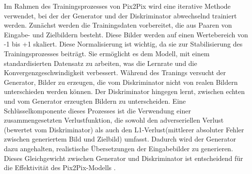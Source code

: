 Im Rahmen des Trainingsprozesses von Pix2Pix wird eine iterative Methode verwendet, bei der der Generator und der Diskriminator abwechselnd trainiert werden. Zunächst werden die Trainingsdaten vorbereitet, die aus Paaren von Eingabe- und Zielbildern besteht. Diese Bilder werden auf einen Wertebereich von -1 bis +1 skaliert. Diese Normalisierung ist wichtig, da sie zur Stabilisierung des Trainingsprozesses beiträgt. Sie ermöglicht es dem Modell, mit einem standardisierten Datensatz zu arbeiten, was die Lernrate und die Konvergenzgeschwindigkeit verbessert. Während des Tranings versucht der Generator, Bilder zu erzeugen, die vom Diskriminator nicht von realen Bildern unterschieden werden können. Der Diskriminator hingegen lernt, zwischen echten und vom Generator erzeugten Bildern zu unterscheiden. Eine Schlüsselkomponente dieses Prozesses ist die Verwendung einer zusammengesetzten Verlustfunktion, die sowohl den adverseriellen Verlust (bewertet vom Diskriminator) als auch den L1-Verlust(mittlerer absoluter Fehler zwischen generiertem Bild und Zielbild) umfasst. Dadurch wird der Generator dazu angehalten, realistische Übersetzungen der Eingabebilder zu generieren. Dieses Gleichgewicht zwischen Generator und Diskriminator ist entscheidend für die Effektivität des Pix2Pix-Modells \cite{HazemAbdelmotaalAhmedA.AbdouAhmedF.OmarDaliaMohamedElSebaityKhaledAbdelazeem.2021}.
  

